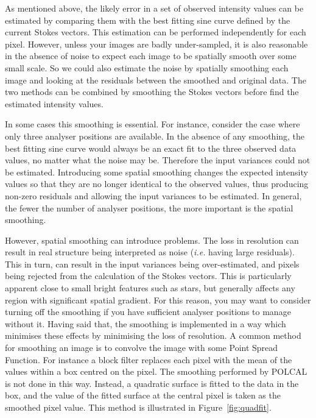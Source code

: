 \documentclass[twoside,11pt]{article}
\newcommand{\latex}[1]{#1}
\newcommand{\html}[1]{}
\renewcommand{\_}{\texttt{\symbol{95}}}
\begin{document}
\begin{enumerate}
As mentioned above, the likely error in a set of observed intensity
values can be estimated by comparing them with the best fitting sine
curve defined by the current Stokes vectors. This estimation can be
performed independently for each pixel. However, unless your images are
badly under-sampled, it is also reasonable in the absence of noise to
expect each image to be spatially smooth over some small scale. So we
could also estimate the noise by spatially smoothing each image and
looking at the residuals between the smoothed and original data. The two
methods can be combined by smoothing the Stokes vectors before find the
estimated intensity values.

In some cases this smoothing is essential. For instance, consider the
case where only three analyser positions are available. In the absence of 
any smoothing, the best fitting sine curve would always be an exact fit 
to the three observed data values, no matter what the noise may be. Therefore 
the input variances could not be estimated. Introducing some spatial
smoothing changes the expected intensity values so that they are no
longer identical to the observed values, thus producing non-zero
residuals and allowing the input variances to be estimated. In general,
the fewer the number of analyser positions, the more important is the 
spatial smoothing.

However, spatial smoothing can introduce problems. The loss in resolution
can result in real structure being interpreted as noise (\emph{i.e.}
having large residuals). This in turn, can result in the input variances
being over-estimated, and pixels being rejected from the calculation of
the Stokes vectors. This is particularly apparent close to small bright
features such as stars, but generally affects any region with significant
spatial gradient. For this reason, you may want to consider turning off
the smoothing if you have sufficient analyser positions to manage without
it. Having said that, the smoothing is implemented in a way which
minimises these effects by minimising the loss of resolution. A common
method for smoothing an image is to convolve the image with some Point
Spread Function. For instance a block filter replaces each pixel with the
mean of the values within a box centred on the pixel. The smoothing
performed by POLCAL is not done in this way. Instead, a quadratic surface
is fitted to the data in the box, and the value of the fitted surface at
the central pixel is taken as the smoothed pixel value. This method is
illustrated in \latex{Figure~\ref{fig:quadfit}.} \html{the next figure:}


\end{enumerate}
\end{document}
